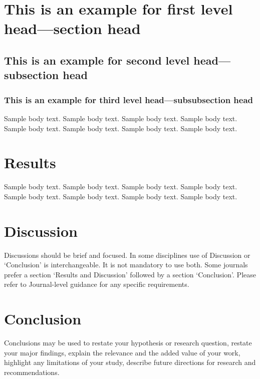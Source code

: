 \documentclass[pdflatex,sn-mathphys]{sn-jnl}%
\theoremstyle{thmstyleone}%
\theoremstyle{thmstyletwo}%
\theoremstyle{thmstylethree}%
\begin{document}
\section{This is an example for first level head---section head}
\label{sec:example}


\subsection{This is an example for second level head---subsection head}
\label{subsec:example}

\subsubsection{This is an example for third level head---subsubsection head}
\label{subsubsec:example}

Sample body text.
Sample body text.
Sample body text.
Sample body text.
Sample body text.
Sample body text.
Sample body text.
Sample body text.



\section{Results}
\label{sec:results}

Sample body text.
Sample body text.
Sample body text.
Sample body text.
Sample body text.
Sample body text.
Sample body text.
Sample body text.



\section{Discussion}
\label{sec:discussion}

Discussions should be brief and focused.
In some disciplines use of Discussion or `Conclusion' is interchangeable.
It is not mandatory to use both.
Some journals prefer a section `Results and Discussion' followed by a section `Conclusion'.
Please refer to Journal-level guidance for any specific requirements.



\section{Conclusion}
\label{sec:conclusion}

Conclusions may be used to restate your hypothesis or research question, restate your major findings, explain the relevance and the added value of your work, highlight any limitations of your study, describe future directions for research and recommendations. 
\end{document}
